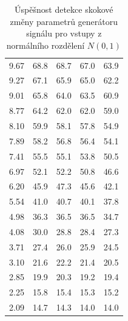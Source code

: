 \documentclass[11pt,twoside,openright]{report}
\begin{document}
\begin{appendices}
\begin{table}[!h]
\begin{center}
\begin{tabular}{|c|c|c|c|c|}
9.67 & 68.8 & 68.7 & 67.0 & 63.9 \\ 
9.27 & 67.1 & 65.9 & 65.0 & 62.2 \\ 
9.01 & 65.8 & 64.0 & 63.5 & 60.9 \\ 
8.77 & 64.2 & 62.0 & 62.0 & 59.0 \\ 
8.10 & 59.9 & 58.1 & 57.8 & 54.9 \\ 
7.89 & 58.2 & 56.8 & 56.4 & 54.1 \\ 
7.41 & 55.5 & 55.1 & 53.8 & 50.5 \\ 
6.97 & 52.1 & 52.2 & 50.8 & 46.6 \\ 
6.20 & 45.9 & 47.3 & 45.6 & 42.1 \\ 
5.54 & 41.0 & 40.7 & 40.1 & 37.8 \\ 
4.98 & 36.3 & 36.5 & 36.5 & 34.7 \\ 
4.08 & 30.0 & 28.8 & 28.4 & 27.3 \\ 
3.71 & 27.4 & 26.0 & 25.9 & 24.5 \\ 
3.10 & 21.6 & 22.2 & 21.4 & 20.5 \\ 
2.85 & 19.9 & 20.3 & 19.2 & 19.4 \\   
2.25 & 15.8 & 15.4 & 15.3 & 15.2 \\ 
2.09 & 14.7 & 14.3 & 14.0 & 14.0 \\ 
\hline
\end{tabular}
\caption{Úspěšnost detekce skokové změny parametrů generátoru signálu pro vstupy z normálního rozdělení $N(0,1)$}
\label{tab:normal}
\end{center}
\end{table}
\clearpage



\end{appendices}
\end{document}
